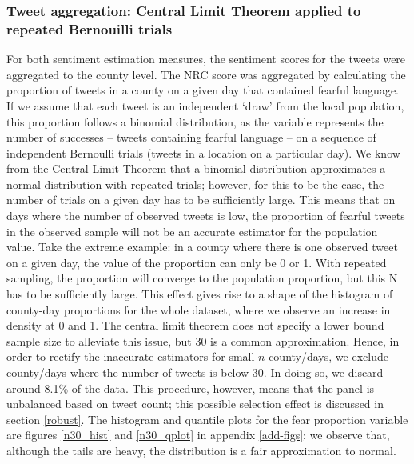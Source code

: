\documentclass[12pt,a4]{article}
\begin{document}
\subsubsection{Tweet aggregation: Central Limit Theorem applied to repeated Bernouilli trials}\label{aggregation}
For both sentiment estimation measures, the sentiment scores for the tweets were aggregated to the county level. The NRC score was aggregated by calculating the proportion of tweets in a county on a given day that contained fearful language. If we assume that each tweet is an independent `draw' from the local population, this proportion follows a  binomial distribution, as the variable represents the number of successes -- tweets containing fearful language -- on a sequence of independent Bernoulli trials (tweets in a location on a particular day). We know from the Central Limit Theorem that a binomial distribution approximates a normal distribution with repeated trials; however, for this to be the case, the number of trials on a given day has to be sufficiently large. This means that on days  where the number of observed tweets is low, the proportion of fearful tweets in the observed sample will not be an accurate estimator for the population value. Take the extreme example: in a county where there is one observed tweet on a given day, the value of the proportion can only be 0 or 1. With repeated sampling, the proportion will converge to the population proportion, but this N has to be sufficiently large. This effect gives rise to a shape of the histogram of county-day proportions for the whole dataset, where we observe an increase in density at 0 and 1. The central limit theorem does not specify a lower bound sample size to alleviate this issue, but 30 is a common approximation. Hence, in order to rectify the inaccurate estimators for small-\(n\) county/days, we exclude county/days where the number of tweets is below 30. In doing so, we discard around 8.1\% of the data. This procedure, however, means that the panel is unbalanced based on tweet count; this possible selection effect is discussed in section \ref{robust}. The histogram and quantile plots for the fear proportion variable are figures \ref{n30_hist} and \ref{n30_qplot} in appendix \ref{add-figs}: we observe that, although the tails are heavy, the distribution is a fair approximation to normal.
\end{document}
